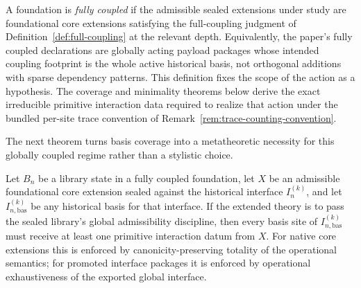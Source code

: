 \documentclass{lmcs}
\begin{document}
\begin{defi}
\label{def:fully-coupled-foundation}
A foundation is \emph{fully coupled} if the admissible sealed extensions under study are
foundational core extensions satisfying the full-coupling judgment of
Definition~\ref{def:full-coupling} at the
relevant depth.  Equivalently, the paper's fully coupled declarations are globally acting
payload packages whose intended coupling footprint is the whole active historical basis, not
orthogonal additions with sparse dependency patterns.  This definition fixes the scope of the
action as a hypothesis.  The coverage and minimality theorems below derive the exact
irreducible primitive interaction data required to realize that action under the bundled
per-site trace convention of Remark~\ref{rem:trace-counting-convention}.
\end{defi}

The next theorem turns basis coverage into a metatheoretic necessity for this globally coupled
regime rather than a stylistic choice.

\begin{thm}
\label{thm:full-coupling-coverage}
Let \(B_n\) be a library state in a fully coupled foundation, let \(X\) be an admissible
foundational core extension sealed against the historical interface \(I_n^{(k)}\), and let
\(I_{n,\mathrm{bas}}^{(k)}\) be any historical basis for that interface.  If the extended theory is
to pass the sealed library's global admissibility discipline, then every basis site of
\(I_{n,\mathrm{bas}}^{(k)}\) must receive at least one primitive interaction datum from \(X\).  For
native core extensions this is enforced by canonicity-preserving totality of the operational
semantics; for promoted interface packages it is enforced by operational exhaustiveness of
the exported global interface.
\end{thm}
\end{document}
